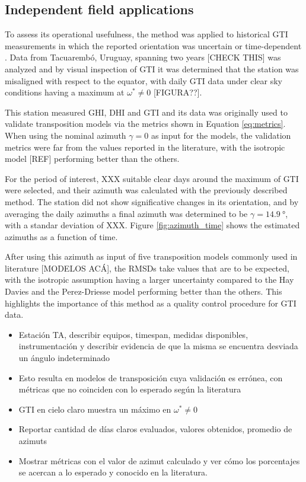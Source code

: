 \subsection{Independent field applications}\label{subsec:fielddata}
To assess its operational usefulness, the method was applied to historical GTI measurements in which the reported orientation was uncertain or time-dependent \citep{piccioli2022thesis}. Data from Tacuarembó, Uruguay, spanning two years [CHECK THIS] was analyzed and by visual inspection of GTI it was determined that the station was misaligned with respect to the equator, with daily GTI data under clear sky conditions having a maximum at $\omega^{\ast} \neq 0$ [FIGURA??]. 

This station measured GHI, DHI and GTI and its data was originally used to validate transposition models via the metrics shown in Equation \eqref{eq:metrics}. When using the nominal azimuth $\gamma = 0$ as input for the models, the validation metrics were far from the values reported in the literature, with the isotropic model [REF] performing better than the others. 

For the period of interest, XXX suitable clear days around the maximum of GTI were selected, and their azimuth was calculated with the previously described method. The station did not show significative changes in its orientation, and by averaging the daily azimuths a final azimuth was determined to be $\gamma = \SI{14.9}{\degree}$, with a standar deviation of XXX. Figure \ref{fig:azimuth_time} shows the estimated azimuths as a function of time.  

After using this azimuth as input of five transposition models commonly used in literature [MODELOS ACÁ], the RMSDs take values that are to be expected, with the isotropic assumption having a larger uncertainty compared to the Hay Davies and the Perez-Driesse model performing better than the others. This highlights the importance of this method as a quality control procedure for GTI data.

\begin{itemize}
	\item Estación TA, describir equipos, timespan, medidas disponibles, instrumentación y describir evidencia de que la misma se encuentra desviada un ángulo indeterminado
	\item Esto resulta en modelos de transposición cuya validación es errónea, con métricas que no coinciden con lo esperado según la literatura
	\item GTI en cielo claro muestra un máximo en $\omega^{\ast} \neq 0$
	\item Reportar cantidad de días claros evaluados, valores obtenidos, promedio de azimuts
	\item Mostrar métricas con el valor de azimut calculado y ver cómo los porcentajes se acercan a lo esperado y conocido en la literatura.
\end{itemize}

